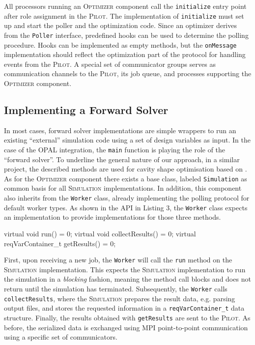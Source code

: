 \documentclass[preprint,linenumbers,amsmath,amssymb,aps,prstab]{revtex4-1}%
\begin{document}
All processors running an \textsc{Optimizer} component call the
  \texttt{initialize} entry point after role assignment in the
  \textsc{Pilot}.
The implementation of \texttt{initialize} must set up and start the poller and
  the optimization code.
Since an optimizer derives from the \texttt{Poller} interface, predefined
  hooks can be used to determine the polling procedure.
Hooks can be implemented as empty methods, but the \texttt{onMessage}
  implementation should reflect the optimization part of the protocol for
  handling events from the \textsc{Pilot}.
A special set of communicator groups serves as communication channels to the
  \textsc{Pilot}, its job queue, and processes supporting the
  \textsc{Optimizer} component.


\subsection{Implementing a Forward Solver}

In most cases, forward solver implementations are simple wrappers to run
  an existing ``external'' simulation code using a set of design variables as
  input. In the case of the OPAL integration, the \texttt{main} function is
  playing the role of the ``forward solver''. To underline the general nature of our approach, 
  in a similar project, the described methods are used for cavity shape optimisation based on \cite{ARBENZ2008381}. 
As for the \textsc{Optimizer} component there exists a base class, labeled
  \texttt{Simulation} as common basis for all \textsc{Simulation}
  implementations.
In addition, this component also inherits from the \texttt{Worker} class,
  already implementing the polling protocol for default worker types.
As shown in the API in Listing 3, the \texttt{Worker} class expects an
  implementation to provide implementations for those three methods.

\begin{code}
virtual void run() = 0;
virtual void collectResults() = 0;
virtual reqVarContainer_t getResults() = 0;
\end{code}

First, upon receiving a new job, the \texttt{Worker} will call the \texttt{run} 
method on the \textsc{Simulation} implementation.
This expects the \textsc{Simulation} implementation to run the simulation in a 
\textit{blocking} fashion, meaning the method call blocks and does not return
until the simulation has terminated.
Subsequently, the \texttt{Worker} calls \texttt{collectResults}, where the
\textsc{Simulation} prepares the result data, e.g. parsing output files,
and stores the requested information in a \texttt{reqVarContainer\_t} data structure.
Finally, the results obtained with \texttt{getResults} are sent to the \textsc{Pilot}. 
As before, the serialized data is exchanged using MPI point-to-point communication using a specific set of communicators.
\end{document}
